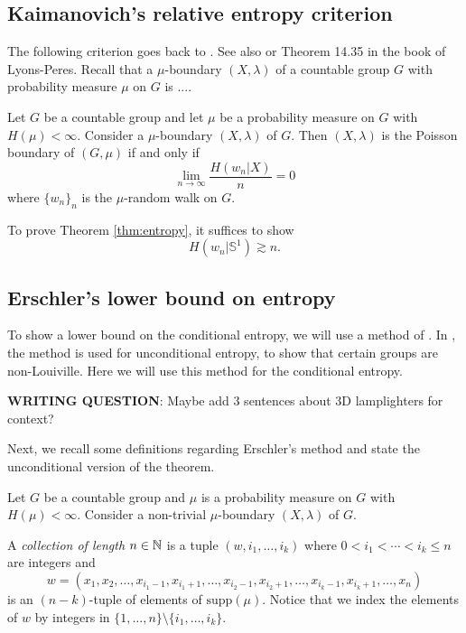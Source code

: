 \subsection{Kaimanovich's relative entropy criterion}

The following criterion goes back to \cite[Theorem 2]{Kaimanovich1985}.
See also \cite[Theorem 4.6]{Kaimanovich2000} or Theorem 14.35 in the book of Lyons-Peres.
Recall that a $\mu$-boundary $(X,\lambda)$ of a countable group $G$ with probability measure $\mu$ on $G$ is ....

\begin{thm} Let $G$ be a countable group and let $\mu$ be a probability measure on $G$ with $H(\mu)<\infty$. Consider a $\mu$-boundary $(X,\lambda)$ of $G$. Then $(X,\lambda)$ is the Poisson boundary of $(G,\mu)$ if and only if 
$$\lim_{n\to \infty} \frac{H(w_n|X)}{n} = 0$$
where $\{w_n\}_n$ is the $\mu$-random walk on $G$.
\end{thm}
To prove Theorem \ref{thm:entropy}, it suffices to show
$$H(w_n|\mathbb{S}^1) \gtrsim n.$$

\subsection{Erschler's lower bound on entropy}
To show a lower bound on the conditional entropy, we will use a method of \cite{Erschler2003}.
In \cite{Erschler2003}, the method is used for unconditional entropy, to show that certain groups are non-Louiville.
Here we will use this method for the conditional entropy.

\textbf{WRITING QUESTION}: Maybe add 3 sentences about 3D lamplighters for context?

Next, we recall some definitions regarding Erschler's method and state the unconditional version of the theorem.

Let $G$ be a countable group and $\mu$ is a probability measure on $G$ with $H(\mu)<\infty$.  Consider a non-trivial $\mu$-boundary $(X,\lambda)$ of $G$.

A \emph{collection of length $n \in {\mathbb N}$} is a tuple $(w, i_1, \ldots, i_k)$ where $0 < i_1 < \cdots < i_k \leq n$ are integers and \[w = (x_1, x_2,\ldots, x_{i_1-1}, x_{i_1 + 1},\ldots, x_{i_2 - 1}, x_{i_2 + 1}, \ldots, x_{i_k-1}, x_{i_k + 1}, \ldots, x_n)\] is an $(n-k)$-tuple of elements of $\mathrm{supp}(\mu)$. Notice that we index the elements of $w$ by integers in $\{1,\ldots, n\} \setminus \{i_1,\ldots, i_k\}$.

